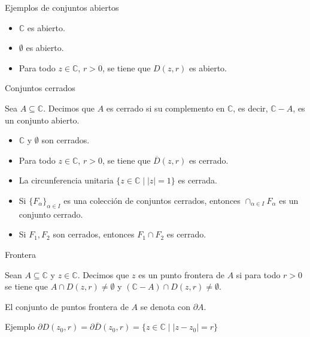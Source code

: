 \documentclass[spanish,presentation]{beamer}
\begin{document}
\begin{frame}[label=sec-1-3]{Ejemplos de conjuntos abiertos}
\begin{exampleblock}{}
\begin{itemize}
\item \(\mathbb{C}\) es abierto.
\item \(\emptyset\) es abierto.
\item Para todo \(z\in \mathbb{C}\), \(r>0\), se tiene que \(D(z,r)\)
      es abierto.
\end{itemize}
\end{exampleblock}
\end{frame}

\begin{frame}[label=sec-1-4]{Conjuntos cerrados}
\begin{definition}
Sea \(A\subseteq \mathbb{C}\). Decimos que \(A\) es cerrado si su
complemento en \(\mathbb{C}\), es decir, \(\mathbb{C}-A\), es un
conjunto abierto.
\end{definition}

\begin{exampleblock}{}
\begin{itemize}
\item \(\mathbb{C}\) y \(\emptyset\) son cerrados.
\item Para todo \(z\in \mathbb{C}\), \(r>0\), se tiene que \(\overline{D}(z,r)\)
      es cerrado.
\item La circunferencia unitaria \(\{z\in \mathbb{C}\mid |z|=1\}\) es cerrada.
\end{itemize}
\end{exampleblock}

\begin{theorem}
\begin{itemize}
\item Si \(\{F_{\alpha}\}_{\alpha\in I}\) es una colección de
conjuntos cerrados, entonces \(\cap_{\alpha\in I}F_{\alpha}\) es un
conjunto cerrado.
\item Si \(F_{1},F_{2}\) son cerrados, entonces \(F_{1}\cap F_{2}\) es
cerrado.
\end{itemize}
\end{theorem}
\end{frame}

\begin{frame}[label=sec-1-5]{Frontera}
\begin{definition}
Sean \(A\subseteq \mathbb{C}\) y \(z\in \mathbb{C}\). Decimos que \(z\) es
un \alert{punto frontera} de \(A\) si para todo \(r>0\) se tiene que
\(A\cap D(z,r)\not=\emptyset\) y \((\mathbb{C}-A)\cap
    D(z,r)\not=\emptyset\). 
\end{definition}

\begin{block}{}
El conjunto de puntos frontera de \(A\) se denota con \(\partial A\).
\end{block}

\begin{exampleblock}{Ejemplo}
\(\partial D(z_{0},r)=\partial \overline{D}(z_{0},r)=\{z\in \mathbb{C}\mid |z-z_{0}|=r\}\)
\end{exampleblock}
\end{frame}
\end{document}
